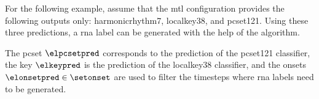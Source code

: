 
For the following example, assume that the \gls{mtl}
configuration provides the following outputs only:
\gls{harmonicrhythm7}, \gls{localkey38}, and \gls{pcset121}.
Using these three predictions, a \gls{rna} label can be
generated with the help of the \algorithmrn{} algorithm.

The \gls{pcset} $\elpcsetpred$ corresponds to the prediction
of the \gls{pcset121} classifier, the key $\elkeypred$ is
the prediction of the \gls{localkey38} classifier, and the
onsets $\elonsetpred \in \setonset$ are used to filter the
timesteps where \gls{rna} labels need to be generated.
